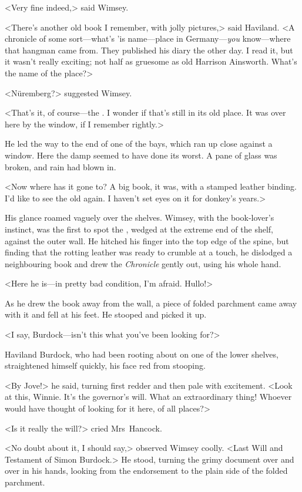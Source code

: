 <Very fine indeed,> said Wimsey.

<There's another old book I remember, with jolly pictures,> said Haviland. <A chronicle of some sort—what's 'is name—place in Germany—\emph{you} know—where that hangman came from. They published his diary the other day. I read it, but it wasn't really exciting; not half as gruesome as old Harrison Ainsworth. What's the name of the place?>

<Nüremberg?> suggested Wimsey.

<That's it, of course—the . I wonder if that's still in its old place. It was over here by the window, if I remember rightly.>

He led the way to the end of one of the bays, which ran up close against a window. Here the damp seemed to have done its worst. A pane of glass was broken, and rain had blown in.

<Now where has it gone to? A big book, it was, with a stamped leather binding. I'd like to see the old  again. I haven't set eyes on it for donkey's years.>

His glance roamed vaguely over the shelves. Wimsey, with the book-lover's instinct, was the first to spot the , wedged at the extreme end of the shelf, against the outer wall. He hitched his finger into the top edge of the spine, but finding that the rotting leather was ready to crumble at a touch, he dislodged a neighbouring book and drew the \textit{\textit{Chronicle}} gently out, using his whole hand.

<Here he is—in pretty bad condition, I'm afraid. Hullo!>

As he drew the book away from the wall, a piece of folded parchment came away with it and fell at his feet. He stooped and picked it up.

<I say, Burdock—isn't this what you've been looking for?>

Haviland Burdock, who had been rooting about on one of the lower shelves, straightened himself quickly, his face red from stooping.

<By Jove!> he said, turning first redder and then pale with excitement. <Look at this, Winnie. It's the governor's will. What an extraordinary thing! Whoever would have thought of looking for it here, of all places?>

<Is it really the will?> cried Mrs~Hancock.

<No doubt about it, I should say,> observed Wimsey coolly. <Last Will and Testament of Simon Burdock.> He stood, turning the grimy document over and over in his hands, looking from the endorsement to the plain side of the folded parchment.

